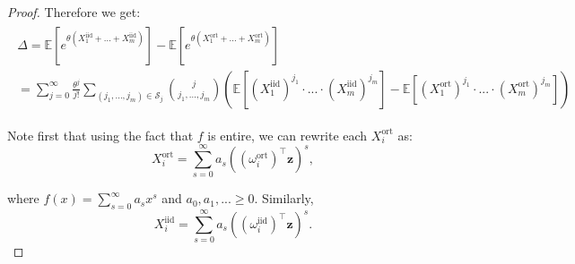 \begin{proof}
Therefore we get:
\begin{align}
\begin{split}
\Delta = \mathbb{E}[e^{\theta (X_{1}^{\mathrm{iid}}+...+X_{m}^{\mathrm{iid}})}] - \mathbb{E}[e^{\theta (X_{1}^{\mathrm{ort}}+...+X_{m}^{\mathrm{ort}})}] \\
=
\sum_{j=0}^{\infty} \frac{\theta^{j}}{j!} \sum_{(j_{1},...,j_{m}) \in \mathcal{S}_{j}} \binom{j}{j_{1},\dots,j_{m}} \left(\mathbb{E}[(X_{1}^{\mathrm{iid}})^{j_{1}} \cdot ... \cdot (X_{m}^{\mathrm{iid}})^{j_{m}}] - \mathbb{E}[(X_{1}^{\mathrm{ort}})^{j_{1}} \cdot ... \cdot (X_{m}^{\mathrm{ort}})^{j_{m}}]\right)
\end{split}
\end{align}


Note first that using the fact that $f$ is entire, we can rewrite each $X_{i}^{\mathrm{ort}}$ as:
\begin{equation}
\label{x_ort_formula}
X_{i}^{\mathrm{ort}} = \sum_{s=0}^{\infty} a_{s}((\omega_{i}^{\mathrm{ort}})^{\top}\mathbf{z})^{s},
\end{equation}

where $f(x) = \sum_{s=0}^{\infty} a_{s}x^{s}$
and $a_{0},a_{1},... \geq 0$.
Similarly,
\begin{equation}
\label{x_iid_formula}
X_{i}^{\mathrm{iid}} = \sum_{s=0}^{\infty} a_{s}((\omega_{i}^{\mathrm{iid}})^{\top}\mathbf{z})^{s}.
\end{equation}


\end{proof}
